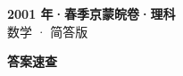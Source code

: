 \documentclass[zihao=-4, a4paper]{ctexart}
\begin{document}
\begin{center}
  {\Large\bfseries 2001 年·春季京蒙皖卷·理科}\\[4pt]
  {\large 数学 · 简答版}
\end{center}
\medskip
{}

\clearpage
{}
\begin{center}{\Large\bfseries 答案速查}\end{center}
\medskip

\end{document}
